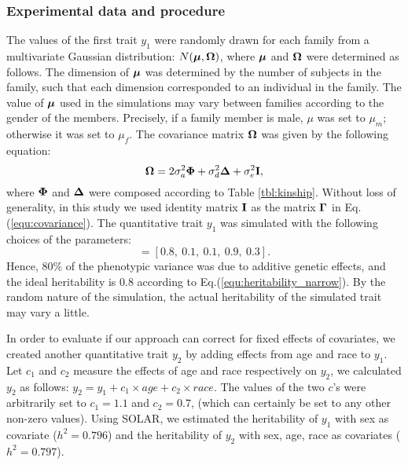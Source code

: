 \documentclass[10pt,letterpaper]{article}
\newcommand{\matrx}[1]{\ensuremath\boldsymbol{\rm #1}}
\newcommand{\vect}[1]{\ensuremath\boldsymbol{\rm #1}}
\begin{document}
\subsubsection*{Experimental data and procedure}
The values of the first trait $y_1$ were randomly drawn for each family  from a multivariate Gaussian distribution: $N(\vect \mu,\matrx \Omega)$, where $\vect \mu$ and $\matrx \Omega$ were determined as follows. The dimension of $\vect \mu$ was determined by the number of subjects in the family, such that each dimension corresponded to an individual in the family. The value of $\vect \mu$ used in the simulations may vary  between families according to the gender of the members. Precisely, if a family member is male, $\mu$ was set to $\mu_m$; otherwise it was set to $\mu_f$. The covariance matrix $\matrx \Omega$ was given by the following equation:
\begin{equation}
\label{equ:trait_cov}
\matrx \Omega = 2\sigma_a^2 \matrx \Phi + \sigma_d^2 \matrx \Delta + \sigma_e^2 \matrx I,
\end{equation}
where $\matrx \Phi$ and $\matrx \Delta$ were composed according to Table \ref{tbl:kinship}. Without loss of generality, in this study we used identity matrix $\matrx I$ as the matrix $\matrx \Gamma$ in Eq.(\ref{equ:covariance}). The quantitative trait $y_1$ was simulated with the following choices of the parameters: 
\begin{equation}[\sigma_a^2,~ \sigma_d^2, ~\sigma_e^2,~ \mu_m,~ \mu_f] = [0.8,~ 0.1,~ 0.1,~ 0.9,~ 0.3]. \label{equ:heritability_narrow}
\end{equation}
Hence, 80\% of the phenotypic variance was due to additive genetic effects, and the ideal heritability is 0.8 according to Eq.(\ref{equ:heritability_narrow}). By the random nature of the simulation, the actual heritability of the simulated trait may vary a little. 

In order to evaluate if our approach can correct for fixed effects of covariates, we created another quantitative trait $y_2$ by adding effects from age and race to $y_1$. Let $c_1$ and $c_2$ measure the effects of age and race respectively on $y_2$, we calculated $y_2$ as follows: $y_2 = y_1 + c_1 \times age + c_2 \times race$. The values of the two $c$'s were arbitrarily set to $c_1 = 1.1$ and $c_2=0.7$, (which can certainly be set to any other non-zero values). Using SOLAR, we estimated the heritability of $y_1$ with sex as covariate ($h^2 = 0.796$) and the heritability of $y_2$ with sex, age, race as covariates ($h^2 = 0.797$).
\end{document}
